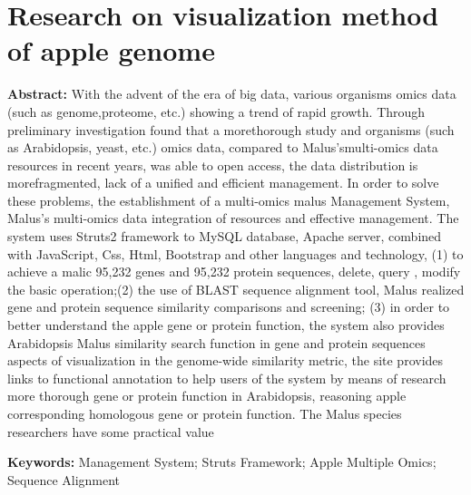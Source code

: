 \thispagestyle{empty}
\chapter*{Research on visualization method of apple genome}

\vspace{1em}

\textbf {\large Abstract: }\normalsize{With the advent of the era of big data, various organisms omics data (such as genome,proteome, etc.) showing a trend of rapid growth. Through preliminary investigation found that a morethorough study and organisms (such as Arabidopsis, yeast, etc.) omics data, compared to Malus'smulti-omics data resources in recent years, was able to open access, the data distribution is morefragmented, lack of a unified and efficient management. In order to solve these problems, the
establishment of a multi-omics malus Management System, Malus's multi-omics data integration of resources and effective management. The system uses Struts2 framework to MySQL database, Apache server, combined with JavaScript, Css, Html, Bootstrap and other languages and technology, (1) to achieve a malic 95,232 genes and 95,232 protein sequences, delete, query , modify the basic operation;(2) the use of BLAST sequence alignment tool, Malus realized gene and protein sequence similarity
comparisons and screening; (3) in order to better understand the apple gene or protein function, the
system also provides Arabidopsis Malus similarity search function in gene and protein sequences aspects
of visualization in the genome-wide similarity metric, the site provides links to functional annotation to
help users of the system by means of research more thorough gene or protein function in Arabidopsis,
reasoning apple corresponding homologous gene or protein function. The Malus species researchers have
some practical value}

\textbf{\large Keywords: }\normalsize{Management System; Struts Framework; Apple Multiple Omics; Sequence Alignment}
\thispagestyle{empty}
